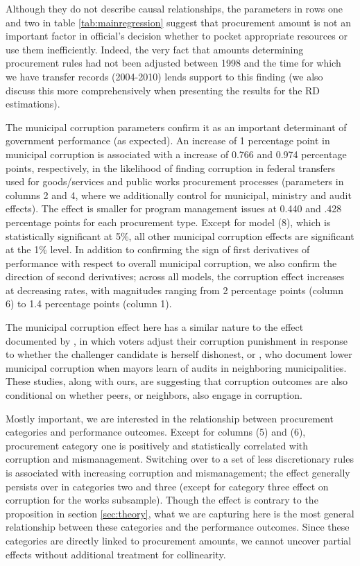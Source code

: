 \documentclass[11pt]{article}
\begin{document}
Although they do not describe causal relationships, the parameters in rows one and two in table \ref{tab:mainregression} suggest that procurement amount is not an important factor in official's decision whether to pocket appropriate resources or use them inefficiently. Indeed, the very fact that amounts determining procurement rules had not been adjusted between 1998 and the time for which we have transfer records (2004-2010) lends support to this finding (we also discuss this more comprehensively when presenting the results for the RD estimations).

The municipal corruption parameters confirm it as an important determinant of government performance (as expected). An increase of 1 percentage point in municipal corruption is associated with a increase of 0.766 and 0.974 percentage points, respectively, in the likelihood of finding corruption in federal transfers used for goods/services and public works procurement processes (parameters in columns 2 and 4, where we additionally control for municipal, ministry and audit effects). The effect is smaller for program management issues at 0.440 and .428 percentage points for each procurement type. Except for model (8), which is statistically significant at 5\%, all other municipal corruption effects are significant at the 1\% level. In addition to confirming the sign of first derivatives of performance with respect to overall municipal corruption, we also confirm the direction of second derivatives; across all models, the corruption effect increases at decreasing rates, with magnitudes ranging from 2 percentage points (column 6) to 1.4 percentage points (column 1).

The municipal corruption effect here has a similar nature to the effect documented by \citet{ChongDoesCorruptionInformation2015}, in which voters adjust their corruption punishment in response to whether the challenger candidate is herself dishonest, or \citet{FinanGovernmentAuditsReduce2018}, who document lower municipal corruption when mayors learn of audits in neighboring municipalities. These studies, along with ours, are suggesting that corruption outcomes are also conditional on whether peers, or neighbors, also engage in corruption.

Mostly important, we are interested in the relationship between procurement categories and performance outcomes. Except for columns (5) and (6), procurement category one is positively and statistically correlated with corruption and mismanagement. Switching over to a set of less discretionary rules is associated with increasing corruption and mismanagement; the effect generally persists over in categories two and three (except for category three effect on corruption for the works subsample). Though the effect is contrary to the proposition in section \ref{sec:theory}, what we are capturing here is the most general relationship between these categories and the performance outcomes. Since these categories are directly linked to procurement amounts, we cannot uncover partial effects without additional treatment for collinearity.
\end{document}
